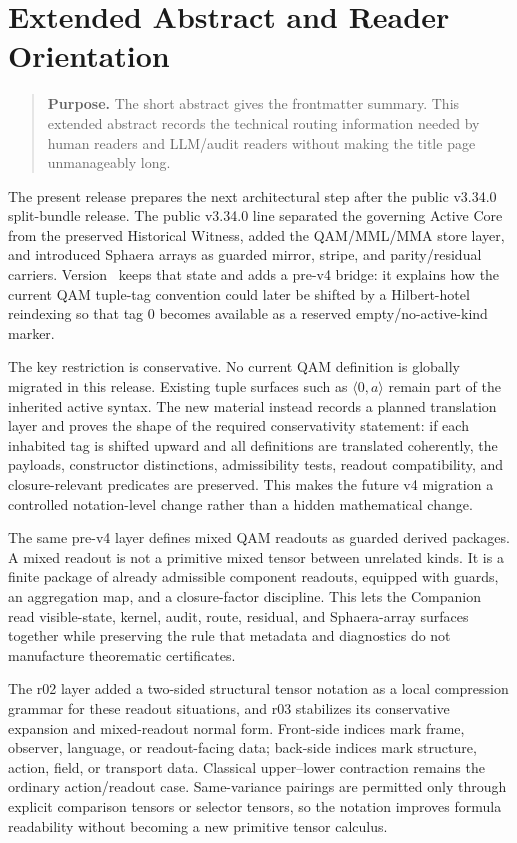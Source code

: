 \section*{Extended Abstract and Reader Orientation}
\begin{quote}\small
\noindent\textbf{Purpose.} The short abstract gives the frontmatter summary. This extended abstract records the technical routing information needed by human readers and LLM/audit readers without making the title page unmanageably long.
\end{quote}

The present release prepares the next architectural step after the public v3.34.0 split-bundle release. The public v3.34.0 line separated the governing Active Core from the preserved Historical Witness, added the QAM/MML/MMA store layer, and introduced Sphaera arrays as guarded mirror, stripe, and parity/residual carriers. Version~\docversion{} keeps that state and adds a pre-v4 bridge: it explains how the current QAM tuple-tag convention could later be shifted by a Hilbert-hotel reindexing so that tag 0 becomes available as a reserved empty/no-active-kind marker.

The key restriction is conservative. No current QAM definition is globally migrated in this release. Existing tuple surfaces such as $\langle 0,a\rangle$ remain part of the inherited active syntax. The new material instead records a planned translation layer and proves the shape of the required conservativity statement: if each inhabited tag is shifted upward and all definitions are translated coherently, the payloads, constructor distinctions, admissibility tests, readout compatibility, and closure-relevant predicates are preserved. This makes the future v4 migration a controlled notation-level change rather than a hidden mathematical change.

The same pre-v4 layer defines mixed QAM readouts as guarded derived packages. A mixed readout is not a primitive mixed tensor between unrelated kinds. It is a finite package of already admissible component readouts, equipped with guards, an aggregation map, and a closure-factor discipline. This lets the Companion read visible-state, kernel, audit, route, residual, and Sphaera-array surfaces together while preserving the rule that metadata and diagnostics do not manufacture theorematic certificates.

The r02 layer added a two-sided structural tensor notation as a local compression grammar for these readout situations, and r03 stabilizes its conservative expansion and mixed-readout normal form. Front-side indices mark frame, observer, language, or readout-facing data; back-side indices mark structure, action, field, or transport data. Classical upper--lower contraction remains the ordinary action/readout case. Same-variance pairings are permitted only through explicit comparison tensors or selector tensors, so the notation improves formula readability without becoming a new primitive tensor calculus.

